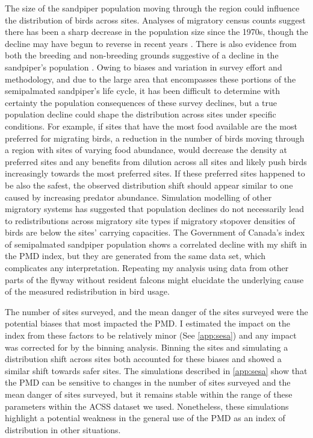 The size of the sandpiper population moving through the region could influence the distribution of birds across sites. Analyses of migratory census counts suggest there has been a sharp decrease in the population size since the 1970s, though the decline may have begun to reverse in recent years \citep{bart_survey_2007,Andres2012b,Gratto-Trevor2012}. There is also evidence from both the breeding and non-breeding grounds suggestive of a decline in the sandpiper's population \citep{Smith2012a,morrison_dramatic_2012}. Owing to biases and variation in survey effort and methodology, and due to the large area that encompasses these portions of the semipalmated sandpiper's life cycle, it has been difficult to determine with certainty the population consequences of these survey declines, but a true population decline could shape the distribution across sites under specific conditions. For example, if sites that have the most food available are the most preferred for migrating birds, a reduction in the number of birds moving through a region with sites of varying food abundance, would decrease the density at preferred sites and any benefits from dilution across all sites and likely push birds increasingly towards the most preferred sites. If these preferred sites happened to be also the safest, the observed distribution shift should appear similar to one caused by increasing predator abundance. Simulation modelling of other migratory systems has suggested that population declines do not necessarily lead to redistributions across migratory site types \citep{Taylor2007} if migratory stopover densities of birds are below the sites' carrying capacities. The Government of Canada's index of semipalmated sandpiper population \citep{GovernmentofCanada} shows a correlated decline with my shift in the PMD index, but they are generated from the same data set, which complicates any interpretation. Repeating my analysis using data from other parts of the flyway without resident falcons might elucidate the underlying cause of the measured redistribution in bird usage. 

The number of sites surveyed, and the mean danger of the sites surveyed were the potential biases that most impacted the PMD. I estimated the impact on the index from these factors to be relatively minor (See \autoref{app:sesa}) and any impact was corrected for by the binning analysis. Binning the sites and simulating a distribution shift across sites both accounted for these biases and showed a similar shift towards safer sites. The simulations described in \autoref{app:sesa} show that the PMD can be sensitive to changes in the number of sites surveyed and the mean danger of sites surveyed, but it remains stable within the range of these parameters within the ACSS dataset we used. Nonetheless, these simulations highlight a potential weakness in the general use of the PMD as an index of distribution in other situations.

